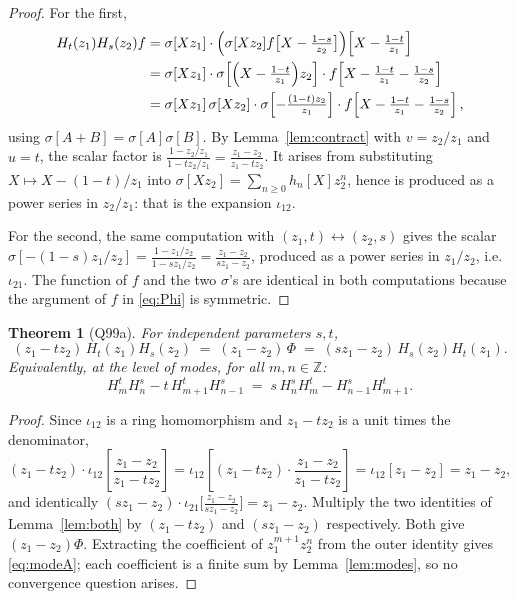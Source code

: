\documentclass[11pt]{article}
\newtheorem{theorem}{Theorem}[section]
\theoremstyle{definition}
\newcommand{\Z}{\mathbb{Z}}
\newcommand{\Hop}{H}
\newcommand{\iotain}{\iota_{12}}
\newcommand{\iotaout}{\iota_{21}}
\begin{document}
\begin{proof}
For the first,
\begin{align*}
  \Hop_t(z_1)\Hop_s(z_2)f
  &=\sigma[Xz_1]\cdot\Bigl(\sigma[Xz_2]f\bigl[X-\tfrac{1-s}{z_2}\bigr]\Bigr)
      \Bigl[X-\tfrac{1-t}{z_1}\Bigr]\\
  &=\sigma[Xz_1]\cdot\sigma\!\left[\Bigl(X-\tfrac{1-t}{z_1}\Bigr)z_2\right]\cdot
      f\!\left[X-\tfrac{1-t}{z_1}-\tfrac{1-s}{z_2}\right]\\
  &=\sigma[Xz_1]\,\sigma[Xz_2]\cdot\sigma\!\left[-\tfrac{(1-t)z_2}{z_1}\right]\cdot
      f\!\left[X-\tfrac{1-t}{z_1}-\tfrac{1-s}{z_2}\right],
\end{align*}
using $\sigma[A+B]=\sigma[A]\sigma[B]$. By Lemma~\ref{lem:contract} with $v=z_2/z_1$ and $u=t$,
the scalar factor is $\frac{1-z_2/z_1}{1-tz_2/z_1}=\frac{z_1-z_2}{z_1-tz_2}$. It arises from
substituting $X\mapsto X-(1-t)/z_1$ into $\sigma[Xz_2]=\sum_{n\ge0}h_n[X]z_2^n$, hence is
produced as a power series in $z_2/z_1$: that is the expansion $\iotain$.

For the second, the same computation with $(z_1,t)\leftrightarrow(z_2,s)$ gives the scalar
$\sigma[-(1-s)z_1/z_2]=\frac{1-z_1/z_2}{1-sz_1/z_2}=\frac{z_1-z_2}{sz_1-z_2}$, produced as a
power series in $z_1/z_2$, i.e.\ $\iotaout$. The function of $f$ and the two $\sigma$'s are
identical in both computations because the argument of $f$ in \eqref{eq:Phi} is symmetric.
\end{proof}

\begin{theorem}[Q99a]\label{thm:A}
For independent parameters $s,t$,
\[
  (z_1-t z_2)\,\Hop_t(z_1)\Hop_s(z_2)
  \;=\;(z_1-z_2)\,\Phi
  \;=\;(s z_1-z_2)\,\Hop_s(z_2)\Hop_t(z_1).
\]
Equivalently, at the level of modes, for all $m,n\in\Z$:
\begin{equation}\label{eq:modeA}
  \Hop^{t}_m \Hop^{s}_n-t\,\Hop^{t}_{m+1}\Hop^{s}_{n-1}
  \;=\;s\,\Hop^{s}_n \Hop^{t}_m-\Hop^{s}_{n-1}\Hop^{t}_{m+1}.
\end{equation}
\end{theorem}

\begin{proof}
Since $\iotain$ is a ring homomorphism and $z_1-tz_2$ is a unit times the denominator,
\[
  (z_1-tz_2)\cdot\iotain\!\left[\frac{z_1-z_2}{z_1-tz_2}\right]
  =\iotain\!\left[(z_1-tz_2)\cdot\frac{z_1-z_2}{z_1-tz_2}\right]=\iotain[z_1-z_2]=z_1-z_2,
\]
and identically $(sz_1-z_2)\cdot\iotaout\bigl[\frac{z_1-z_2}{sz_1-z_2}\bigr]=z_1-z_2$.
Multiply the two identities of Lemma~\ref{lem:both} by $(z_1-tz_2)$ and $(sz_1-z_2)$
respectively. Both give $(z_1-z_2)\Phi$. Extracting the coefficient of $z_1^{m+1}z_2^{n}$
from the outer identity gives \eqref{eq:modeA}; each coefficient is a finite sum by
Lemma~\ref{lem:modes}, so no convergence question arises.
\end{proof}
\end{document}
